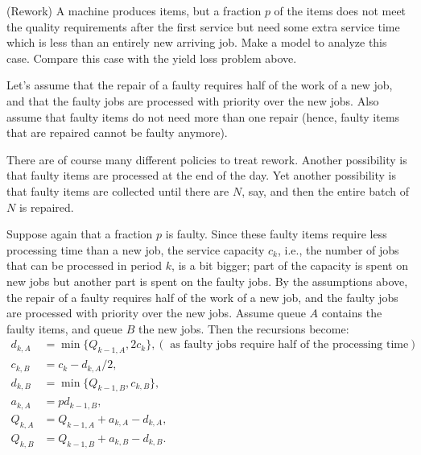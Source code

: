 \begin{exercise}
  (Rework) A machine produces items, but a fraction $p$ of the items
  does not meet the quality requirements after the first service but
  need some extra service time which is less than an entirely new arriving
  job. Make a model to analyze this case. Compare this case with the
  yield loss problem above. 

  Let's assume that the repair of a faulty requires half of the work
  of a new job, and that the faulty jobs are processed with priority
  over the new jobs.  Also assume that faulty items do not need more than one repair (hence, faulty items that are repaired cannot be faulty anymore).

There are of course many different policies to
  treat rework.   Another possibility is that faulty items are processed at the end of
  the day. Yet another possibility is that faulty items are collected
  until there are $N$, say, and then the entire batch of $N$ is
  repaired.
  \begin{solution}
    Suppose again that a fraction $p$ is faulty. Since these faulty
    items require less processing time than a new job, the service
    capacity $c_k$, i.e., the number of jobs that can be processed in
    period $k$, is a bit bigger; part of the capacity is spent on new
    jobs but another part is spent on the faulty jobs. By the
    assumptions above, the repair of a faulty requires half of the
    work of a new job, and the faulty jobs are processed with priority
    over the new jobs. Assume queue $A$ contains the faulty items, and
    queue $B$ the new jobs. Then the recursions become:
\begin{equation*}
  \begin{split}
    d_{k,A} &= \min\{Q_{k-1, A}, 2c_k\}, (\text{ as faulty jobs require half of the processing time})\\
    c_{k,B} &= c_k - d_{k,A}/2, \\
    d_{k,B} &= \min\{Q_{k-1, B}, c_{k,B}\}, \\
    a_{k,A} &= p d_{k-1, B}, \\
    Q_{k,A} &= Q_{k-1, A} + a_{k,A} - d_{k,A}, \\
    Q_{k,B} &= Q_{k-1, B} + a_{k,B} - d_{k,B}.
  \end{split}
\end{equation*}
  \end{solution}
\end{exercise}


